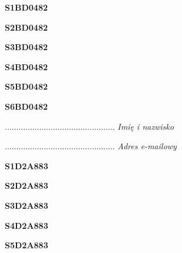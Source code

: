 \begin{turn}{90}\huge \textbf{S1BD0482}\end{turn}

\begin{turn}{90}\huge \textbf{S2BD0482}\end{turn}

\begin{turn}{90}\huge \textbf{S3BD0482}\end{turn}

\begin{turn}{90}\huge \textbf{S4BD0482}\end{turn}

\begin{turn}{90}\huge \textbf{S5BD0482}\end{turn}

\begin{turn}{90}\huge \textbf{S6BD0482}\end{turn}

\begin{turn}{90}\begin{minipage}{\linewidth} \vspace{20mm} ................................................  \textit{Imię i nazwisko}\end{minipage}\end{turn}

\begin{turn}{90}\begin{minipage}{\linewidth} \vspace{20mm} ................................................  \textit{Adres e-mailowy}\end{minipage}\end{turn}

\begin{turn}{90}\huge \textbf{S1D2A883}\end{turn}

\begin{turn}{90}\huge \textbf{S2D2A883}\end{turn}

\begin{turn}{90}\huge \textbf{S3D2A883}\end{turn}

\begin{turn}{90}\huge \textbf{S4D2A883}\end{turn}

\begin{turn}{90}\huge \textbf{S5D2A883}\end{turn}

